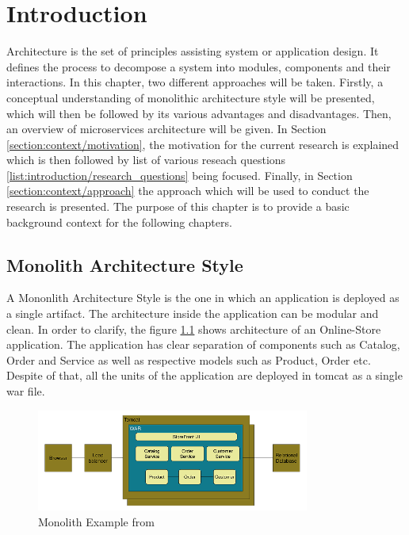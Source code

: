 \chapter{Introduction}\label{chapter:introduction}
Architecture is the set of principles assisting system or application design. \cite{Dashofy:2009aa} It defines the process to decompose a system into modules, components and their interactions. \cite{Brown:2015aa} In this chapter, two different approaches will be taken. Firstly, a conceptual understanding of monolithic architecture style will be presented, which will then be followed by its various advantages and disadvantages. Then, an overview of microservices architecture will be given. In Section \ref{section:context/motivation}, the motivation for the current research is explained which is then followed by  list of various reseach questions \ref{list:introduction/research_questions} being focused. Finally, in Section \ref{section:context/approach} the approach which will be used to conduct the research is presented. The purpose of this chapter is to provide a basic background context for the following chapters.

\section{Monolith Architecture Style}\label{section:context/monolith}
A Mononlith Architecture Style is the one in which an application is deployed as a single artifact. The architecture inside the application can be modular and clean. In order to clarify, the figure \ref{fig:context/monolith-example} shows architecture of an Online-Store application. The application has clear separation of components such as Catalog, Order and Service as well as respective models such as Product, Order etc. Despite of that, all the units of the application are deployed in tomcat as a single war file.\cite{Richardson:2014aa}\cite{Richardson:2014ab}

\begin{figure}[H]
\begin{center}
\includegraphics[width=0.8\textwidth]{figures/context-monolith-example}
\caption{Monolith Example from \cite{Richardson:2014aa}}
\label{fig:context/monolith-example}
\end{center}
\end{figure}

